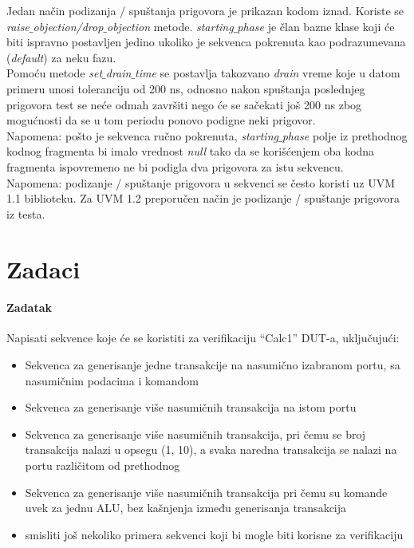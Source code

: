 Jedan način podizanja / spuštanja prigovora je prikazan kodom iznad. Koriste se
\emph{raise\(\_\)objection/drop\(\_\)objection} metode.
\emph{starting\(\_\)phase} je član bazne klase koji će biti ispravno postavljen
jedino ukoliko je sekvenca pokrenuta kao podrazumevana (\emph{default}) za neku
fazu.\\

Pomoću metode \emph{set\(\_\)drain\(\_\)time} se postavlja takozvano
\emph{drain} vreme koje u datom primeru unosi toleranciju od 200 ns, odnosno
nakon spuštanja poslednjeg prigovora test se neće odmah završiti nego će se
sačekati još 200 ns zbog mogućnosti da se u tom periodu ponovo podigne neki
prigovor.\\

Napomena: pošto je sekvenca ručno pokrenuta, \emph{starting\(\_\)phase} polje iz
prethodnog kodnog fragmenta bi imalo vrednost \emph{null} tako da se korišćenjem
oba kodna fragmenta ispovremeno ne bi podigla dva prigovora za istu sekvencu.\\

Napomena: podizanje / spuštanje prigovora u sekvenci se često koristi uz UVM 1.1
biblioteku. Za UVM 1.2 preporučen način je podizanje / spuštanje prigovora iz
testa.


\section{Zadaci}

\paragraph{Zadatak}

Napisati sekvence koje će se koristiti za verifikaciju ``Calc1'' DUT-a,
uključujući:

\begin{itemize}
\item Sekvenca za generisanje jedne transakcije na nasumično izabranom portu, sa
  nasumičnim podacima i komandom
\item Sekvenca za  generisanje više nasumičnih transakcija na istom portu
\item Sekvenca za generisanje više nasumičnih transakcija, pri čemu se broj
  transakcija nalazi u opsegu (1, 10), a svaka naredna transakcija se nalazi na
  portu različitom od prethodnog
\item Sekvenca za  generisanje više nasumičnih transakcija pri čemu su komande
  uvek za jednu ALU, bez kašnjenja između generisanja transakcija
\item smisliti još nekoliko primera sekvenci koji bi mogle biti korisne za
  verifikaciju
\end{itemize}

